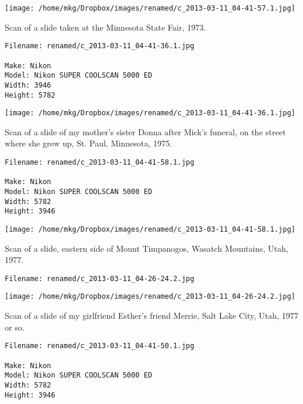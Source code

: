 \begin{landscape}

\texttt{[image: /home/mkg/Dropbox/images/renamed/c\_2013-03-11\_04-41-57.1.jpg]}
\end{landscape}



\noindent Scan of a slide taken at the Minnesota State Fair, 1973.
\begin{lstlisting}
Filename: renamed/c_2013-03-11_04-41-36.1.jpg

Make: Nikon
Model: Nikon SUPER COOLSCAN 5000 ED
Width: 3946
Height: 5782
\end{lstlisting}

\clearpage

\texttt{[image: /home/mkg/Dropbox/images/renamed/c\_2013-03-11\_04-41-36.1.jpg]}
\clearpage


\noindent Scan of a slide of my mother's sister Donna after Mick's funeral, on the street where she grew up, St. Paul, Minnesota, 1975.
\begin{lstlisting}
Filename: renamed/c_2013-03-11_04-41-58.1.jpg

Make: Nikon
Model: Nikon SUPER COOLSCAN 5000 ED
Width: 5782
Height: 3946
\end{lstlisting}

\begin{landscape}

\texttt{[image: /home/mkg/Dropbox/images/renamed/c\_2013-03-11\_04-41-58.1.jpg]}
\end{landscape}



\noindent Scan of a slide, eastern side of Mount Timpanogos, Wasatch Mountains, Utah, 1977.
\begin{lstlisting}
Filename: renamed/c_2013-03-11_04-26-24.2.jpg

\end{lstlisting}

\clearpage

\texttt{[image: /home/mkg/Dropbox/images/renamed/c\_2013-03-11\_04-26-24.2.jpg]}
\clearpage


\noindent Scan of a slide of my girlfriend Esther's friend Merrie, Salt Lake City, Utah, 1977 or so.
\begin{lstlisting}
Filename: renamed/c_2013-03-11_04-41-50.1.jpg

Make: Nikon
Model: Nikon SUPER COOLSCAN 5000 ED
Width: 5782
Height: 3946
\end{lstlisting}

